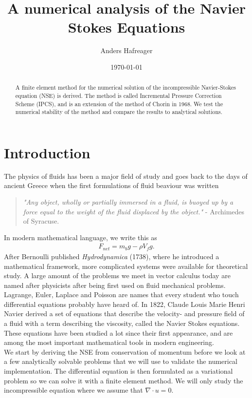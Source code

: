 \documentclass[a4paper,10pt]{article}
\title{A numerical analysis of the Navier Stokes Equations}
\date{\today}
\author{Anders Hafreager}
\renewcommand{\(}{\left(}
\renewcommand{\)}{\right)}
\begin{document}
\maketitle

\begin{abstract}
A finite element method for the numerical solution of the incompressible Navier-Stokes equation (NSE) is derived. The method is called Incremental Pressure Correction Scheme (IPCS)\cite{ns_numerical_solutions}, and is an extension of the method of Chorin in 1968\cite{chorin}. We test the numerical stability of the method and compare the results to analytical solutions.
\end{abstract}

\section{Introduction}
The physics of fluids has been a major field of study and goes back to the days of ancient Greece \cite{wiki_fluid_mechanics} when the first formulations of fluid beaviour was written
\begin{quote}
\textit{"Any object, wholly or partially immersed in a fluid, is buoyed up by a force equal to the weight of the fluid displaced by the object."} - Archimedes of Syracuse.
\end{quote}
In modern mathematical language, we write this as 
\begin{align*}
  F_{net} = m_bg - \rho V_f g.
\end{align*}
After Bernoulli published \textit{Hydrodynamica} (1738), where he introduced a mathematical framework, more complicated systems were available for theoretical study. A large amount of the problems we meet in vector calculus today are named after physicists after being first used on fluid mechanical problems. Lagrange, Euler, Laplace and Poisson are names that every student who touch differential equations probably have heard of. In 1822, Claude Louis Marie Henri Navier derived a set of equations that describe the velocity- and pressure field of a fluid with a term describing the viscosity, called the Navier Stokes equations.\cite{ns_history} These equations have been studied a lot since their first appearance, and are among the most important mathematical tools in modern engineering.\\
We start by deriving the NSE from conservation of momentum before we look at a few analytically solvable problems that we will use to validate the numerical implementation. The differential equation is then formulated as a variational problem so we can solve it with a finite element method. We will only study the incompressible equation where we assume that $\nabla \cdot u = 0$. 
 
\end{document}
